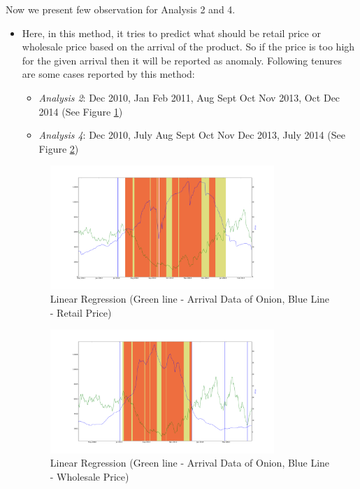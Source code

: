 		
		Now we present few observation for Analysis 2 and 4.
		
		
		\begin{itemize}
			\item Here, in this method, it tries to predict what should be retail price or wholesale price based on the arrival of the product. So if the price is too high for the given arrival then it will be reported as anomaly.
			Following tenures are some cases reported by this method:
			\begin{itemize}
				\item \textit{Analysis 2}: Dec 2010, Jan Feb 2011, Aug Sept Oct Nov 2013, Oct Dec 2014 (See Figure \ref{fig:12221})
				\item \textit{Analysis 4}: Dec 2010, July Aug Sept Oct Nov Dec 2013, July 2014 (See Figure \ref{fig:12241})
			\end{itemize}
			\begin{figure}[H]
		    	\centering
  		    	\includegraphics[width=0.8\textwidth]{graphs/12221.png}
		    	\caption{Linear Regression (Green line - Arrival Data of Onion, Blue Line - Retail Price)}
		    	\label{fig:12221}
			\end{figure}
			
			\begin{figure}[H]
		    	\centering
  		    	\includegraphics[width=0.8\textwidth]{graphs/12241.png}
		    	\caption{Linear Regression (Green line - Arrival Data of Onion, Blue Line - Wholesale Price)}
		    	\label{fig:12241}
			\end{figure}
			

\end{itemize}
